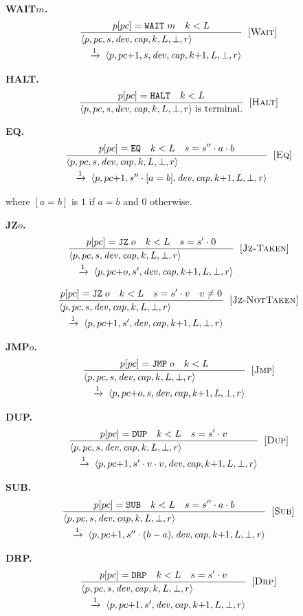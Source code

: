 \documentclass[a4paper,fleqn,longmktitle]{cas-dc}
\makeatletter
\newcommand{\irule}[4]{%
  \[
  \frac{\displaystyle #1}
       {\displaystyle
        \begin{array}{@{}l@{}}
          #2 \\[2pt]
          \quad\xrightarrow{1}\; #3
        \end{array}}
  \;\;[\textsc{#4}]
  \]%
}
\makeatother
\begin{document}
{\noindent\textbf{WAIT\;$m$.}
\irule{p[pc] = \texttt{WAIT}\;m \quad k < L}
      {\langle p, pc, s, \mathit{dev}, \mathit{cap}, k, L, \bot, r \rangle}
      {\langle p, pc{+}1, s, \mathit{dev}, \mathit{cap}, k{+}1, L, \bot, r \rangle}
      {Wait}

\noindent\textbf{HALT.}
\[
\frac{p[pc] = \texttt{HALT} \quad k < L}
     {\langle p, pc, s, \mathit{dev}, \mathit{cap}, k, L, \bot, r \rangle
      \;\text{is terminal.}}
      \;\;[\textsc{Halt}]
\]

\noindent\textbf{EQ.}
\irule{p[pc] = \texttt{EQ} \quad k < L \quad s = s'' \cdot a \cdot b}
      {\langle p, pc, s, \mathit{dev}, \mathit{cap}, k, L, \bot, r \rangle}
      {\langle p, pc{+}1, s'' \cdot [a = b], \mathit{dev}, \mathit{cap}, k{+}1, L, \bot, r \rangle}
      {Eq}
where $[a=b]$ is $1$ if $a=b$ and $0$ otherwise.

\noindent\textbf{JZ\;$o$.}
\irule{p[pc] = \texttt{JZ}\;o \quad k < L \quad s = s' \cdot 0}
      {\langle p, pc, s, \mathit{dev}, \mathit{cap}, k, L, \bot, r \rangle}
      {\langle p, pc{+}o, s', \mathit{dev}, \mathit{cap}, k{+}1, L, \bot, r \rangle}
      {Jz-Taken}
\irule{p[pc] = \texttt{JZ}\;o \quad k < L \quad s = s' \cdot v \quad v \neq 0}
      {\langle p, pc, s, \mathit{dev}, \mathit{cap}, k, L, \bot, r \rangle}
      {\langle p, pc{+}1, s', \mathit{dev}, \mathit{cap}, k{+}1, L, \bot, r \rangle}
      {Jz-NotTaken}

\noindent\textbf{JMP\;$o$.}
\irule{p[pc] = \texttt{JMP}\;o \quad k < L}
      {\langle p, pc, s, \mathit{dev}, \mathit{cap}, k, L, \bot, r \rangle}
      {\langle p, pc{+}o, s, \mathit{dev}, \mathit{cap}, k{+}1, L, \bot, r \rangle}
      {Jmp}

\noindent\textbf{DUP.}
\irule{p[pc] = \texttt{DUP} \quad k < L \quad s = s' \cdot v}
      {\langle p, pc, s, \mathit{dev}, \mathit{cap}, k, L, \bot, r \rangle}
      {\langle p, pc{+}1, s' \cdot v \cdot v, \mathit{dev}, \mathit{cap}, k{+}1, L, \bot, r \rangle}
      {Dup}

\noindent\textbf{SUB.}
\irule{p[pc] = \texttt{SUB} \quad k < L \quad s = s'' \cdot a \cdot b}
      {\langle p, pc, s, \mathit{dev}, \mathit{cap}, k, L, \bot, r \rangle}
      {\langle p, pc{+}1, s'' \cdot (b - a), \mathit{dev}, \mathit{cap}, k{+}1, L, \bot, r \rangle}
      {Sub}

\noindent\textbf{DRP.}
\irule{p[pc] = \texttt{DRP} \quad k < L \quad s = s' \cdot v}
      {\langle p, pc, s, \mathit{dev}, \mathit{cap}, k, L, \bot, r \rangle}
      {\langle p, pc{+}1, s', \mathit{dev}, \mathit{cap}, k{+}1, L, \bot, r \rangle}
      {Drp}

}
\end{document}
